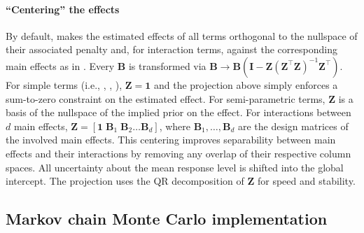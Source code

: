 \documentclass[article, shortnames, nojss, noheadings, notitle]{jss}
\begin{document}
\paragraph*{``Centering'' the effects}
By default,  makes the estimated effects of all terms orthogonal to the nullspace of their associated penalty
and, for interaction terms, against the corresponding main effects as in \citet{Yau:Kohn:Wood:2003}.
Every $\bm B$ is transformed via
$\bm B \rightarrow \bm B \left(\bm I - \bm Z(\bm Z^\top \bm Z)^{-1} \bm
Z^\top\right)$. For simple terms (i.e., , , ),
$\bm Z = \bm 1$ and the projection above simply enforces a sum-to-zero constraint
on the estimated effect. For semi-parametric terms, $\bm Z$ is a basis of the nullspace of the implied
prior on the effect. For interactions between $d$ main effects, $\bm Z = \left[\bm 1\; \bm B_1\; \bm B_2 \ldots \bm B_d\right]$,
where $\bm B_1,\dots, \bm B_d$ are the design matrices of the involved main effects.
This centering improves separability between main effects and their interactions by removing any overlap of their respective column
spaces. All uncertainty about the mean response level is shifted into the global
intercept. The projection uses the QR decomposition of $\bm Z$ for speed and stability.

\subsection{Markov chain Monte Carlo implementation}\label{mcmc}
\end{document}
